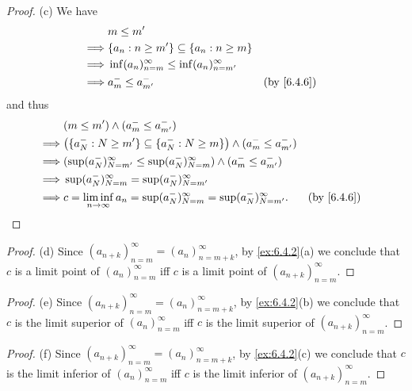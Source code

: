 \begin{proof}{(c)}
  We have
  \begin{align*}
             & m \leq m'                                                                             \\
    \implies & \{a_n : n \geq m'\} \subseteq \{a_n : n \geq m\}                                      \\
    \implies & \inf(a_n)_{n = m}^\infty \leq \inf(a_n)_{n = m'}^\infty                               \\
    \implies & a_m^- \leq a_{m'}^-                                     &  & \text{(by \cref{6.4.6})}
  \end{align*}
  and thus
  \begin{align*}
             & (m \leq m') \land (a_m^- \leq a_{m'}^-)                                                                                  \\
    \implies & \big(\{a_N^- : N \geq m'\} \subseteq \{a_N^- : N \geq m\}\big) \land (a_m^- \leq a_{m'}^-)                               \\
    \implies & (\sup(a_N^-)_{N = m'}^\infty \leq \sup(a_N^-)_{N = m}^\infty) \land (a_m^- \leq a_{m'}^-)                                \\
    \implies & \sup(a_N^-)_{N = m}^\infty = \sup(a_N^-)_{N = m'}^\infty                                                                 \\
    \implies & c = \liminf_{n \to \infty} a_n = \sup(a_N^-)_{N = m}^\infty = \sup(a_N^-)_{N = m'}^\infty. &  & \text{(by \cref{6.4.6})}
  \end{align*}
\end{proof}

\begin{proof}{(d)}
  Since \((a_{n + k})_{n = m}^\infty = (a_n)_{n = m + k}^\infty\), by \cref{ex:6.4.2}(a) we conclude that \(c\) is a limit point of \((a_n)_{n = m}^\infty\) iff \(c\) is a limit point of \((a_{n + k})_{n = m}^\infty\).
\end{proof}

\begin{proof}{(e)}
  Since \((a_{n + k})_{n = m}^\infty = (a_n)_{n = m + k}^\infty\), by \cref{ex:6.4.2}(b) we conclude that \(c\) is the limit superior of \((a_n)_{n = m}^\infty\) iff \(c\) is the limit superior of \((a_{n + k})_{n = m}^\infty\).
\end{proof}

\begin{proof}{(f)}
  Since \((a_{n + k})_{n = m}^\infty = (a_n)_{n = m + k}^\infty\), by \cref{ex:6.4.2}(c) we conclude that \(c\) is the limit inferior of \((a_n)_{n = m}^\infty\) iff \(c\) is the limit inferior of \((a_{n + k})_{n = m}^\infty\).
\end{proof}

